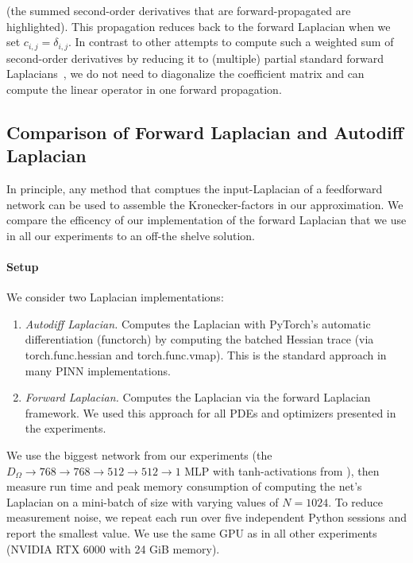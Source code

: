 (the summed second-order derivatives that are forward-propagated are highlighted).
This propagation reduces back to the forward Laplacian  when we set $c_{i,j} = \delta_{i,j}$.
In contrast to other attempts to compute such a weighted sum of second-order derivatives by reducing it to (multiple) partial standard forward Laplacians~\cite{li2024dof}, we do not need to diagonalize the coefficient matrix and can compute the linear operator in one forward propagation.

\subsection{Comparison of Forward Laplacian and Autodiff Laplacian}\label{app:subsec:comparison}

In principle, any method that comptues the input-Laplacian of a feedforward network can be used to assemble the Kronecker-factors in our approximation. 
We compare the efficency of our implementation of the forward Laplacian that we use in all our experiments to an off-the shelve solution. 


\paragraph{Setup}
We consider two Laplacian implementations:
\begin{enumerate}
  \item \emph{Autodiff Laplacian.} Computes the Laplacian with PyTorch's automatic differentiation (functorch) by computing the batched Hessian trace (via torch.func.hessian and torch.func.vmap). This is the standard approach in many PINN implementations.
  \item \emph{Forward Laplacian.} Computes the Laplacian via the forward Laplacian framework. We used this approach for all PDEs and optimizers presented in the experiments.
\end{enumerate}

We use the biggest network from our experiments (the $D_\Omega \to 768\to 768\to 512\to 512\to 1$ MLP with tanh-activations from ), then measure run time and peak memory consumption of computing the net's Laplacian on a mini-batch of size with varying values of $N=1024$. To reduce measurement noise, we repeat each run over five independent Python sessions and report the smallest value. We use the same GPU as in all other experiments (NVIDIA RTX 6000 with 24 GiB memory).

